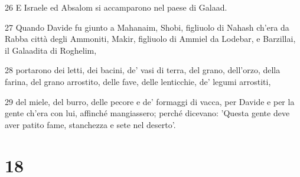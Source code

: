 \par 26 E Israele ed Absalom si accamparono nel paese di Galaad.
\par 27 Quando Davide fu giunto a Mahanaim, Shobi, figliuolo di Nahash ch'era da Rabba città degli Ammoniti, Makir, figliuolo di Ammiel da Lodebar, e Barzillai, il Galaadita di Roghelim,
\par 28 portarono dei letti, dei bacini, de' vasi di terra, del grano, dell'orzo, della farina, del grano arrostito, delle fave, delle lenticchie, de' legumi arrostiti,
\par 29 del miele, del burro, delle pecore e de' formaggi di vacca, per Davide e per la gente ch'era con lui, affinché mangiassero; perché dicevano: 'Questa gente deve aver patito fame, stanchezza e sete nel deserto'.

\chapter{18}

